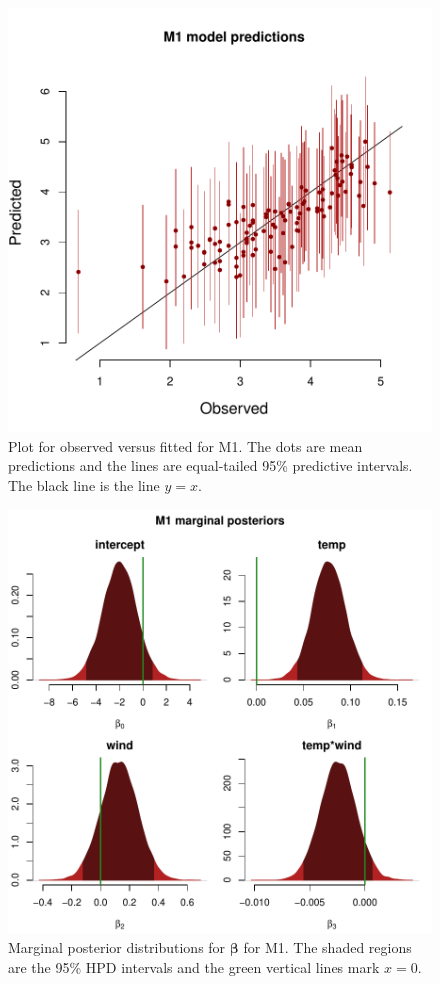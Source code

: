 \documentclass{asaproc}
\newcommand{\m}[1]{\mathbf{\bm{#1}}}
\begin{document}
\begin{figure}
\centering
\includegraphics[scale=0.53]{figs/pred_obsfit_1.pdf}
\caption{Plot for observed versus fitted for M1. The dots are mean predictions and the lines are equal-tailed 95\% predictive intervals. The black line is the line $y=x$.}
\label{obsfit1}
\end{figure}

\begin{figure}
\centering
\includegraphics[scale=0.40]{figs/post_1.pdf}
\caption{Marginal posterior distributions for $\m{\beta}$ for M1. The shaded regions are the 95\% HPD intervals and the green vertical lines mark $x=0$.}
\label{post1}
\end{figure}
\end{document}
